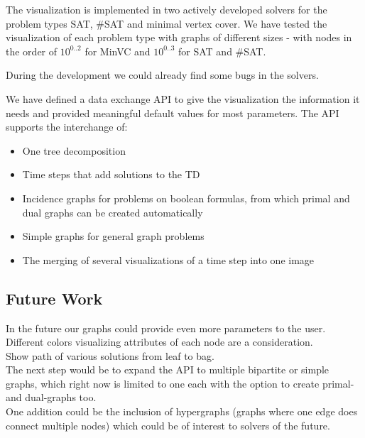 \documentclass[a4paper, 12pt, bibliography=totoc]{scrartcl}
\begin{document}
The visualization is implemented in two actively developed solvers for the problem types {SAT}, {\#SAT} and {minimal vertex cover}. We have tested the visualization of each problem type with graphs of different sizes - with nodes in the order of $10^{0..2}$ for MinVC and $10^{0..3}$ for SAT and \#SAT.

During the development we could already find some bugs in the solvers.

We have defined a data exchange API to give the visualization the information it needs and provided meaningful default values for most parameters. The API supports the interchange of:
\begin{itemize}
	\item One tree decomposition
	\item Time steps that add solutions to the TD
	\item Incidence graphs for problems on boolean formulas, from which primal and dual graphs can be created automatically
	\item Simple graphs for general graph problems
	\item The merging of several visualizations of a time step into one image
\end{itemize}


\subsection{Future Work}
In the future our graphs could provide even more parameters to the user. \\

Different colors visualizing attributes of each node are a consideration.\\

Show path of various solutions from leaf to bag. \\

The next step would be to expand the API to multiple bipartite or simple graphs, which right now is limited to one each with the option to create primal- and dual-graphs too.\\

One addition could be the inclusion of hypergraphs (graphs where one edge does connect multiple nodes) which could be of interest to solvers of the future.\\
\end{document}
